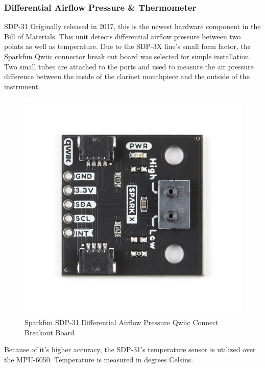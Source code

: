 \subsubsection{Differential Airflow Pressure \& Thermometer}

SDP-31
Originally released in 2017, this is the newest hardware component in the Bill of Materials. This unit detects differential airflow pressure between two points as well as temperature. Due to the SDP-3X line’s small form factor, the Sparkfun Qwiic connector break out board was selected for simple installation. Two small tubes are attached to the ports and used to measure the air pressure difference between the inside of the clarinet mouthpiece and the outside of the instrument.

\begin{center}
    \begin{figure}
        \centering
        \includegraphics[scale=1.5, angle=90]{diagrams/oem/spd31.jpg}
        \caption{Sparkfun SDP-31 Differential Airflow Pressure Qwiic Connect Breakout Board}
        \label{fig:sdp-31}
    \end{figure}
\end{center}

Because of it’s higher accuracy, the SDP-31’s temperature sensor is utilized over the MPU-6050. Temperature is measured in degrees Celsius.



